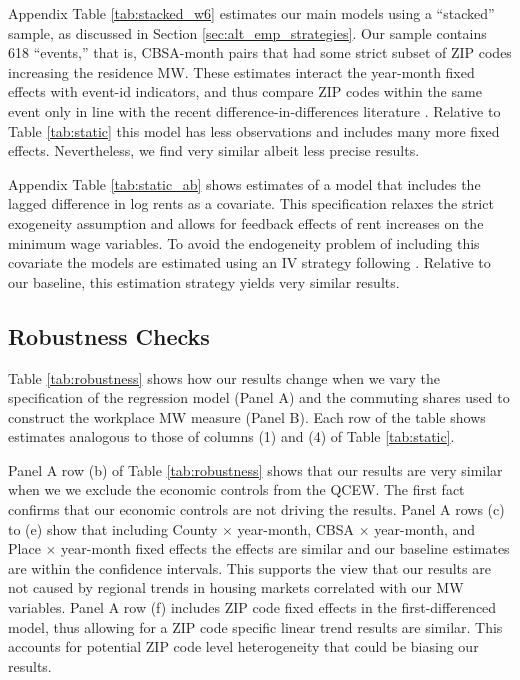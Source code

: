 Appendix Table \ref{tab:stacked_w6} estimates our main models using a ``stacked''
sample, as discussed in Section \ref{sec:alt_emp_strategies}.
Our sample contains 618 ``events,'' that is, CBSA-month pairs that had some 
strict subset of ZIP codes increasing the residence MW.
These estimates interact the year-month fixed effects with event-id indicators, 
and thus compare ZIP codes within the same event only in line with the recent
difference-in-differences literature \parencite{CallawaySantAnna2021, CallawayEtAl2021}.
Relative to Table \ref{tab:static} this model has less observations and includes 
many more fixed effects. Nevertheless, we find very similar albeit less precise results.

Appendix Table \ref{tab:static_ab} shows estimates of a model that includes
the lagged difference in log rents as a covariate.
This specification relaxes the strict exogeneity assumption and allows for 
feedback effects of rent increases on the minimum wage variables.
To avoid the endogeneity problem of including this covariate the models are 
estimated using an IV strategy following \textcite{ArellanoBond1991,ArellanoHonore2001}.
Relative to our baseline, this estimation strategy yields very similar results.

\subsection{Robustness Checks}

Table \ref{tab:robustness} shows how our results change when we vary the
specification of the regression model (Panel A) and the commuting shares used 
to construct the workplace MW measure (Panel B).
Each row of the table shows estimates analogous to those of columns (1) and (4)
of Table \ref{tab:static}.

Panel A row (b) of Table \ref{tab:robustness} shows that our results are very similar 
when we we exclude the economic controls from the QCEW. 
The first fact confirms that our economic controls are not driving the results.
Panel A rows (c) to (e) show that including County $\times$ year-month, 
CBSA $\times$ year-month, and Place $\times$ year-month fixed effects
the effects are similar and our baseline estimates are within the confidence 
intervals. This supports the view that our results are not caused by regional 
trends in housing markets correlated with our MW variables.
Panel A row (f) includes ZIP code fixed effects in the first-differenced model,
thus allowing for a ZIP code specific linear trend results are similar. This 
accounts for potential ZIP code level heterogeneity that could be biasing our results.

